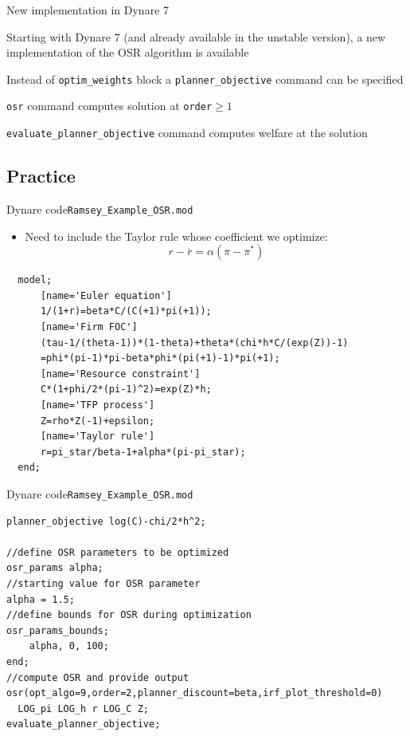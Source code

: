 \documentclass[handout,usepdftitle=false,xcolor=dvipsnames,aspectratio=169]{beamer}
\begin{document}
\begin{frame}{New implementation in Dynare 7}
  \begin{witemize}
    \item Starting with Dynare 7 (and already available in the unstable version), a new implementation of the OSR algorithm is available
    \item Instead of \texttt{optim\_weights} block a \texttt{planner\_objective} command can be specified
    \item  \texttt{osr} command computes solution at \texttt{order}$\geq 1$
    \item \texttt{evaluate\_planner\_objective} command computes welfare at the solution
  \end{witemize}
\end{frame}



\subsection{Practice}

\begin{frame}[fragile]{Dynare code}{\texttt{Ramsey\_Example\_OSR.mod}}
  \begin{itemize}
    \item Need to include the Taylor rule whose coefficient we optimize:
    \begin{equation}
      r-\bar r =\alpha (\pi-\pi^*)
    \end{equation}
  \end{itemize}\vspace{-0.5cm}
  \small
  \begin{verbatim}
  model;
      [name='Euler equation']
      1/(1+r)=beta*C/(C(+1)*pi(+1));
      [name='Firm FOC']
      (tau-1/(theta-1))*(1-theta)+theta*(chi*h*C/(exp(Z))-1)
      =phi*(pi-1)*pi-beta*phi*(pi(+1)-1)*pi(+1);
      [name='Resource constraint']
      C*(1+phi/2*(pi-1)^2)=exp(Z)*h;
      [name='TFP process']
      Z=rho*Z(-1)+epsilon;
      [name='Taylor rule']
      r=pi_star/beta-1+alpha*(pi-pi_star);
  end;
\end{verbatim}
\end{frame}



\begin{frame}[fragile]{Dynare code}{\texttt{Ramsey\_Example\_OSR.mod}}
  \begin{verbatim}
planner_objective log(C)-chi/2*h^2;

//define OSR parameters to be optimized
osr_params alpha;
//starting value for OSR parameter
alpha = 1.5;
//define bounds for OSR during optimization
osr_params_bounds;
    alpha, 0, 100;
end;
//compute OSR and provide output
osr(opt_algo=9,order=2,planner_discount=beta,irf_plot_threshold=0) 
  LOG_pi LOG_h r LOG_C Z;
evaluate_planner_objective;
\end{verbatim}
\end{frame}
\end{document}
